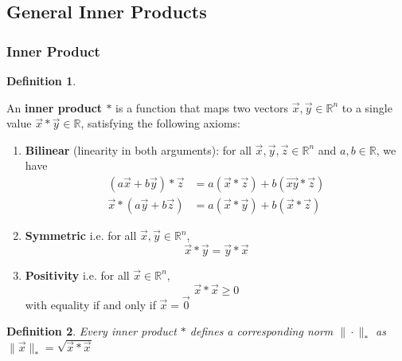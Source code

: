\documentclass[11pt,a4paper]{article}
\newtheorem{definition}{Definition}
\begin{document}
\subsection{General Inner Products}
\subsubsection{ Inner Product}
\begin{definition}\end{definition}
An \textbf{inner product $*$} is a function that maps two vectors $\vec{x},\vec{y}\in \mathbb{R}^n$ to a single value $\vec{x}*\vec{y}\in \mathbb{R}$, satisfying the following axioms:
\begin{enumerate}
    \item \textbf{Bilinear} (linearity in both arguments): for all $\vec{x},\vec{y},\vec{z}\in \mathbb{R}^n$ and $a,b\in \mathbb{R}$, we have
    \begin{equation}
        \begin{aligned}
            (a \vec{x}+ b\vec{y})*\vec{z}&=a(\vec{x}*\vec{z})+b(\vec{xy}*\vec{z})\\
            \vec{x}*(a \vec{y}+b \vec{z})&=a(\vec{x}* \vec{y})+ b(\vec{x}* \vec{z})
        \end{aligned}
        \nonumber
    \end{equation}
    \item \textbf{Symmetric} i.e. for all $\vec{x},\vec{y}\in \mathbb{R}^n$, $$\vec{x}* \vec{y}=\vec{y}* \vec{x}$$
    \item \textbf{Positivity} i.e. for all $\vec{x}\in \mathbb{R}^n$, $$\vec{x}* \vec{x}\geq 0$$ with equality if and only if $\vec{x}=\vec{0}$
\end{enumerate}

\begin{definition}
    Every inner product $*$ defines a corresponding norm $\|\cdot\|_*$ as $\|\vec{x}\|_*=\sqrt{\vec{x}*\vec{x}}$
\end{definition}
\end{document}
